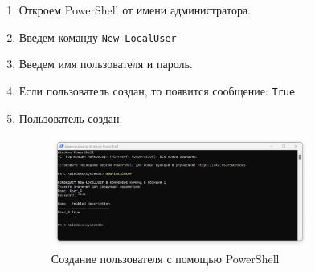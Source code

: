 \documentclass[a4paper, 14pt]{report}
\begin{document}

\begin{enumerate}
    \item {Откроем PowerShell от имени администратора.}
    \item {Введем команду \texttt{New-LocalUser}}
    \item {Введем имя пользователя и пароль.}
    \item {Если пользователь создан, то появится сообщение: \texttt{True}}
    \item {Пользователь создан.
          \begin{figure}[H]
              \centering
              \includegraphics[width=0.8\textwidth]{../images/powershell_create_user.png}
              \caption{Создание пользователя с помощью PowerShell}
          \end{figure}}
\end{enumerate}
\end{document}
